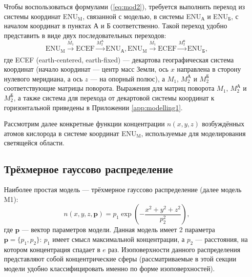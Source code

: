 \documentclass[12pt,a4paper]{article}
\renewcommand{\vec}{\mathbf}
\begin{document}
Чтобы воспользоваться формулами (\ref{eq:mod2}), требуется выполнить переход из системы координат ENU$_\text{M}$, связанной с моделью, в системы ENU$_\text{А}$ и ENU$_\text{Б}$, с началом координат в пунктах А и Б соответственно. Такой переход удобно представить в виде двух последовательных переходов:
 \begin{equation}\label{eq:mod5}
 \text{ENU}_\text{M} \xrightarrow[]{M_1} \text{ECEF} \xrightarrow[]{M_2^\text{А}} \text{ENU}_\text{А}, \text{ENU}_\text{M} \xrightarrow[]{M_1} \text{ECEF} \xrightarrow[]{M_2^\text{Б}} \text{ENU}_\text{Б}, 
 \end{equation}
где ECEF (earth-centered, earth-fixed) --- декартова географическая система координат (начало координат --- центр масс Земли, ось $x$ направлена в сторону нулевого меридиана, а ось $z$ --- на опорный полюс), а $M_1$, $M_2^\text{А}$ и $M_2^\text{Б}$ соответствующие матрицы поворота.
Выражения для матриц поворота $M_1$, $M_2^\text{А}$ и $M_2^\text{Б}$, а также система для перехода от декартовой системы координат к горизонтальной приведены в Приложении \ref{app:modelling1}.

Рассмотрим далее конкретные функции концентрации $n(x,y,z)$ возбуждённых атомов кислорода в системе координат ENU$_\text{M}$, используемые для моделирования светящейся области.

\subsection{Трёхмерное гауссово распределение} \label{subsec:model1}

Наиболее простая модель --- трёхмерное гауссово распределение (далее модель M1):
\begin{equation}\label{eq:gauss1}
n(x,y,z,\vec{p})=p_1 \exp{(-\frac{x^2+y^2+z^2}{p_2^2})},
\end{equation}
где $\vec{p}$ --- вектор параметров модели. Данная модель имеет 2 параметра $\vec{p}=\{p_1,p_2\}$: $p_1$ имеет смысл максимальной концентрации, а $p_2$ --- расстояния, на котором концентрация спадает в $e$ раз. Изоповерхности данного распределения представляют собой концентрические сферы (рассматриваемые в этой секции модели удобно классифицировать именно по форме изоповерхностей). 
\end{document}

